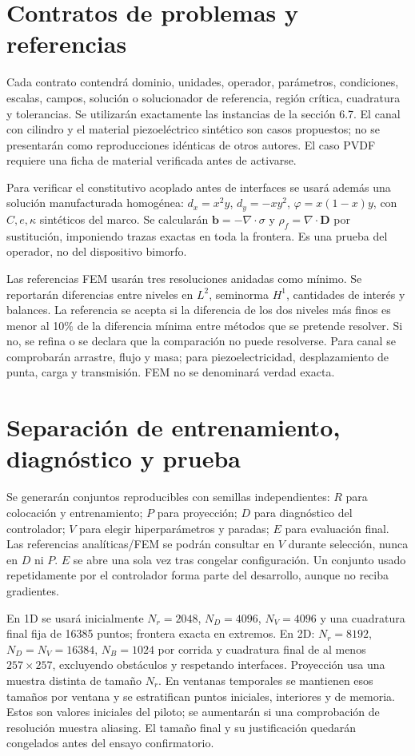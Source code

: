 \section{Contratos de problemas y referencias}
Cada contrato contendrá dominio, unidades, operador, parámetros, condiciones, escalas, campos, solución o solucionador de referencia, región crítica, cuadratura y tolerancias. Se utilizarán exactamente las instancias de la sección 6.7. El canal con cilindro y el material piezoeléctrico sintético son casos propuestos; no se presentarán como reproducciones idénticas de otros autores. El caso PVDF requiere una ficha de material verificada antes de activarse.

Para verificar el constitutivo acoplado antes de interfaces se usará además una solución manufacturada homogénea: $d_x=x^2y$, $d_y=-xy^2$, $\varphi=x(1-x)y$, con $C,e,\kappa$ sintéticos del marco. Se calcularán $\mathbf b=-\nabla\cdot\sigma$ y $\rho_f=\nabla\cdot\mathbf D$ por sustitución, imponiendo trazas exactas en toda la frontera. Es una prueba del operador, no del dispositivo bimorfo.

Las referencias FEM usarán tres resoluciones anidadas como mínimo. Se reportarán diferencias entre niveles en $L^2$, seminorma $H^1$, cantidades de interés y balances. La referencia se acepta si la diferencia de los dos niveles más finos es menor al 10\% de la diferencia mínima entre métodos que se pretende resolver. Si no, se refina o se declara que la comparación no puede resolverse. Para canal se comprobarán arrastre, flujo y masa; para piezoelectricidad, desplazamiento de punta, carga y transmisión. FEM no se denominará verdad exacta.

\section{Separación de entrenamiento, diagnóstico y prueba}
Se generarán conjuntos reproducibles con semillas independientes: $R$ para colocación y entrenamiento; $P$ para proyección; $D$ para diagnóstico del controlador; $V$ para elegir hiperparámetros y paradas; $E$ para evaluación final. Las referencias analíticas/FEM se podrán consultar en $V$ durante selección, nunca en $D$ ni $P$. $E$ se abre una sola vez tras congelar configuración. Un conjunto usado repetidamente por el controlador forma parte del desarrollo, aunque no reciba gradientes.

En 1D se usará inicialmente $N_r=2048$, $N_D=4096$, $N_V=4096$ y una cuadratura final fija de 16385 puntos; frontera exacta en extremos. En 2D: $N_r=8192$, $N_D=N_V=16384$, $N_B=1024$ por corrida y cuadratura final de al menos $257\times257$, excluyendo obstáculos y respetando interfaces. Proyección usa una muestra distinta de tamaño $N_r$. En ventanas temporales se mantienen esos tamaños por ventana y se estratifican puntos iniciales, interiores y de memoria. Estos son valores iniciales del piloto; se aumentarán si una comprobación de resolución muestra aliasing. El tamaño final y su justificación quedarán congelados antes del ensayo confirmatorio.

